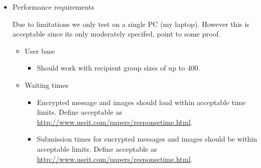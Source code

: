 \begin{itemize}
        \item Performance requirements
        
        Due to limitations we only test on a single PC (my laptop). However this is acceptable since its only moderately specifed, point to some proof.
        
        \begin{itemize}
        
            \item User base
            \begin{itemize}
                \item Should work with recipient group sizes of up to 400.
            \end{itemize}
            
            \item Waiting times
            \begin{itemize}
                \item Encrypted message and images should load within acceptable time limits. Define acceptable as \url{http://www.useit.com/papers/responsetime.html}.
                
                \item Submission times for encrypted messages and images should be within acceptable limits. Define acceptable as \url{http://www.useit.com/papers/responsetime.html}.
            \end{itemize}
            
        \end{itemize}
    
    \end{itemize}